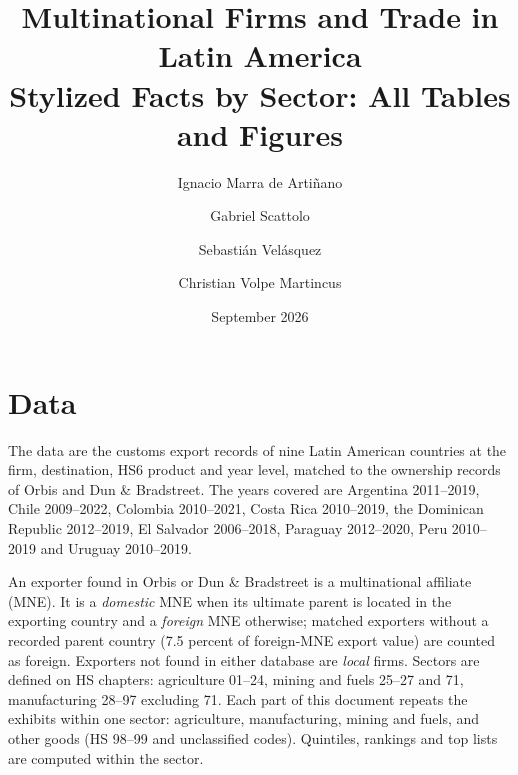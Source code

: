\documentclass[11pt,a4paper]{article}
\title{Multinational Firms and Trade in Latin America\\[4pt]\large Stylized Facts by Sector: All Tables and Figures}
\author{Ignacio Marra de Arti\~nano \and Gabriel Scattolo \and Sebasti\'an Vel\'asquez \and Christian Volpe Martincus}
\date{September 2026}
\begin{document}
\maketitle
\tableofcontents
\clearpage

\section*{Data}

The data are the customs export records of nine Latin American countries at the firm, destination,
HS6 product and year level, matched to the ownership records of Orbis and Dun \& Bradstreet. The
years covered are Argentina 2011--2019, Chile 2009--2022, Colombia 2010--2021, Costa Rica
2010--2019, the Dominican Republic 2012--2019, El Salvador 2006--2018, Paraguay 2012--2020, Peru
2010--2019 and Uruguay 2010--2019.

An exporter found in Orbis or Dun \& Bradstreet is a multinational affiliate (MNE). It is a
\emph{domestic} MNE when its ultimate parent is located in the exporting country and a
\emph{foreign} MNE otherwise; matched exporters without a recorded parent country (7.5 percent of
foreign-MNE export value) are counted as foreign. Exporters not found in either database are
\emph{local} firms. Sectors are defined on HS chapters: agriculture 01--24, mining and fuels
25--27 and 71, manufacturing 28--97 excluding 71.
Each part of this document repeats the exhibits within one sector: agriculture, manufacturing,
mining and fuels, and other goods (HS 98--99 and unclassified codes). Quintiles, rankings and top
lists are computed within the sector.
\end{document}

